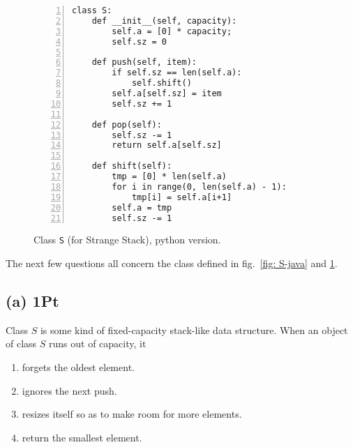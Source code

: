 \documentclass{tufte-handout}
\begin{document}
  \begin{figure}
    
    \begin{lstlisting}[basicstyle=\ttfamily,backgroundcolor=\color{white},
      frame=single,rulecolor=\color{gray!20},framesep=10pt,
      linewidth=12cm,numbers= left]
class S:
    def __init__(self, capacity):
        self.a = [0] * capacity;
        self.sz = 0

    def push(self, item):
        if self.sz == len(self.a):
            self.shift()
        self.a[self.sz] = item
        self.sz += 1

    def pop(self):
        self.sz -= 1
        return self.a[self.sz]

    def shift(self):
        tmp = [0] * len(self.a)
        for i in range(0, len(self.a) - 1):
            tmp[i] = self.a[i+1]
        self.a = tmp
        self.sz -= 1
    \end{lstlisting}
    \caption{\label{fig: S-python} Class {\tt S} (for Strange Stack), python version.}
  \end{figure}
    
    The next few questions all concern the class defined in fig.~\ref{fig: S-java} and \ref{fig: S-python}.

    \subsection*{(a) 1Pt} Class $S$ is some kind of fixed-capacity stack-like data structure.
      When an object of class $S$ runs out of capacity, it
      \begin{enumerate}
      \item forgets the oldest element.\\
      \item ignores the next push.\\
      \item   resizes itself so as to make room for more elements. \\ 
      \item   return the smallest element. \\
 
      \end{enumerate}
\end{document}
